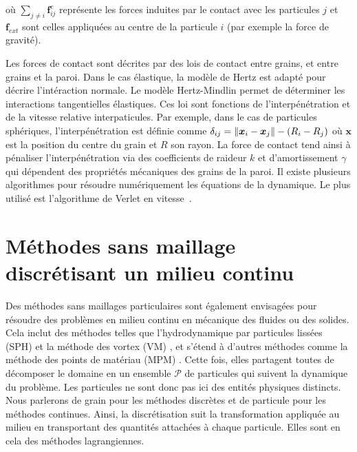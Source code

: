 où $\underset{{\scriptstyle j\neq i}}{\sum}\bm{f}^{c}_{ij}$ représente les forces induites par le contact avec les particules $j$ et $\bm{f}_{ext}$ sont celles appliquées au centre de la particule $i$ (par exemple la force de gravité).

Les forces de contact sont décrites par des lois de contact entre grains, et entre grains et la paroi. Dans le cas élastique, la modèle de Hertz est adapté pour décrire l'intéraction normale. Le modèle Hertz-Mindlin permet de déterminer les interactions tangentielles élastiques. Ces loi sont fonctions de l'interpénétration et de la vitesse relative interpaticules. Par exemple, dans le cas de particules sphériques, l'interpénétration est définie comme $\delta_{ij} = \left\lVert \bm x_i - \bm x_j \right\rVert - (R_i - R_j)$ où $\bm x$  est la position du centre du grain et $R$ son rayon.
La force de contact tend ainsi à pénaliser l'interpénétration via des coefficients de raideur $k$ et d'amortissement $\gamma$ qui dépendent des propriétés mécaniques des grains de la paroi. Il existe plusieurs algorithmes pour résoudre numériquement les équations de la dynamique. Le plus utilisé est l'algorithme de Verlet en vitesse~\cite{verlet_1982}.

\section{Méthodes sans maillage discrétisant un milieu continu}\label{sec:part_cont}
Des méthodes sans maillages particulaires sont également envisagées pour résoudre des problèmes en milieu continu en mécanique des fluides ou des solides. Cela inclut des méthodes telles que l'hydrodynamique par particules lissées (SPH) \cite{lucy_1977,gingold_monaghan_sph_1977} et la méthode des vortex (VM) \cite{cottet_vortex_2000}, et s'étend à d'autres méthodes comme la méthode des points de matériau (MPM) \cite{sulsky_particle_1994}. Cette fois, elles partagent toutes de décomposer le domaine en un ensemble $\mathcal{P}$ de particules qui suivent la dynamique du problème. Les particules ne sont donc pas ici des entités physiques distincts. Nous parlerons de grain pour les méthodes discrètes et de particule pour les méthodes continues. Ainsi, la discrétisation suit la transformation appliquée au milieu en transportant des quantités attachées à chaque particule. Elles sont en cela des méthodes lagrangiennes.


